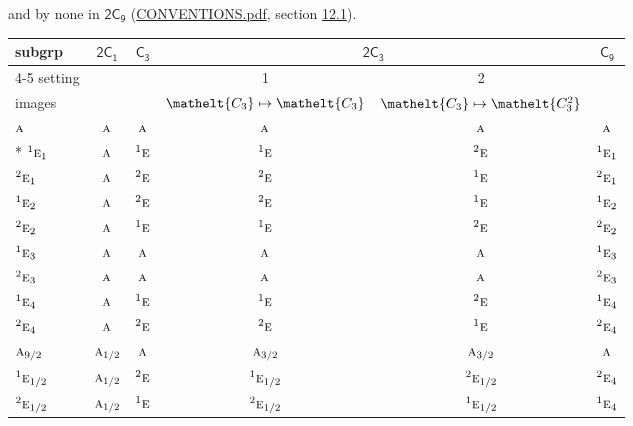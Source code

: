 \documentclass[10pt,a4paper]{article}
\numberwithin{equation}{section}
\newcommand{\eltfont}[1]{{\let\sigma\eltsigma\mathelt{#1}}}
\newcommand{\grp}[1]{\mathsf{#1}}
\newcommand{\irr}[1]{\text{\normalfont\scshape #1}}
\newcommand{\conjpair}[1]{{}^{#1}}
\newcommand{\cls}[1]{\eltfont{#1}}
\begin{document}
and by none in $\grp{2C_{9}}$ (\href{../../CONVENTIONS.pdf}{CONVENTIONS.pdf}, section \href{../../../rotation/CONVENTIONS.pdf\#conv.12.1}{12.1}).
{\small\begin{longtable}{@{}lccccc@{}}\toprule
subgrp & \href{2C1.pdf}{$\grp{2C_{1}}$} & \href{C3.pdf}{$\grp{C_{3}}$} & \multicolumn{2}{c}{\href{2C3.pdf}{$\grp{2C_{3}}$}} & \href{C9.pdf}{$\grp{C_{9}}$}\\\cmidrule(lr){4-5}
setting &  &  & 1 & 2 & \\
images &  &  & {\scriptsize $\cls{C_{3}} \mapsto \cls{C_{3}}$} & {\scriptsize $\cls{C_{3}} \mapsto \cls{C_{3}^{2}}$} & \\\midrule\endhead
\bottomrule\endfoot\endlastfoot
$\irr{a}$ & $\irr{a}$ & $\irr{a}$ & $\irr{a}$ & $\irr{a}$ & $\irr{a}$\\*
$\conjpair{1}\irr{e}_{1}$ & $\irr{a}$ & $\conjpair{1}\irr{e}$ & $\conjpair{1}\irr{e}$ & $\conjpair{2}\irr{e}$ & $\conjpair{1}\irr{e}_{1}$\\
$\conjpair{2}\irr{e}_{1}$ & $\irr{a}$ & $\conjpair{2}\irr{e}$ & $\conjpair{2}\irr{e}$ & $\conjpair{1}\irr{e}$ & $\conjpair{2}\irr{e}_{1}$\\
$\conjpair{1}\irr{e}_{2}$ & $\irr{a}$ & $\conjpair{2}\irr{e}$ & $\conjpair{2}\irr{e}$ & $\conjpair{1}\irr{e}$ & $\conjpair{1}\irr{e}_{2}$\\
$\conjpair{2}\irr{e}_{2}$ & $\irr{a}$ & $\conjpair{1}\irr{e}$ & $\conjpair{1}\irr{e}$ & $\conjpair{2}\irr{e}$ & $\conjpair{2}\irr{e}_{2}$\\
$\conjpair{1}\irr{e}_{3}$ & $\irr{a}$ & $\irr{a}$ & $\irr{a}$ & $\irr{a}$ & $\conjpair{1}\irr{e}_{3}$\\
$\conjpair{2}\irr{e}_{3}$ & $\irr{a}$ & $\irr{a}$ & $\irr{a}$ & $\irr{a}$ & $\conjpair{2}\irr{e}_{3}$\\
$\conjpair{1}\irr{e}_{4}$ & $\irr{a}$ & $\conjpair{1}\irr{e}$ & $\conjpair{1}\irr{e}$ & $\conjpair{2}\irr{e}$ & $\conjpair{1}\irr{e}_{4}$\\
$\conjpair{2}\irr{e}_{4}$ & $\irr{a}$ & $\conjpair{2}\irr{e}$ & $\conjpair{2}\irr{e}$ & $\conjpair{1}\irr{e}$ & $\conjpair{2}\irr{e}_{4}$\\
$\irr{a}_{9/2}$ & $\irr{a}_{1/2}$ & $\irr{a}$ & $\irr{a}_{3/2}$ & $\irr{a}_{3/2}$ & $\irr{a}$\\
$\conjpair{1}\irr{e}_{1/2}$ & $\irr{a}_{1/2}$ & $\conjpair{2}\irr{e}$ & $\conjpair{1}\irr{e}_{1/2}$ & $\conjpair{2}\irr{e}_{1/2}$ & $\conjpair{2}\irr{e}_{4}$\\
$\conjpair{2}\irr{e}_{1/2}$ & $\irr{a}_{1/2}$ & $\conjpair{1}\irr{e}$ & $\conjpair{2}\irr{e}_{1/2}$ & $\conjpair{1}\irr{e}_{1/2}$ & $\conjpair{1}\irr{e}_{4}$\\

\end{longtable}}
\end{document}
